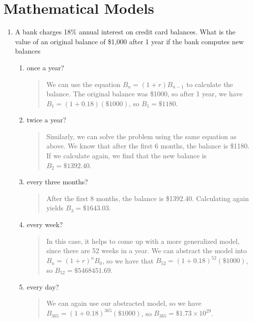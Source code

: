 \documentclass{hw}
\begin{document}
\section{Mathematical Models}
\begin{enumerate}
\item A bank charges 18\% annual interest on credit card balances. What is the value of an original
balance of \$1,000 after 1 year if the bank computes new balances
\begin{enumerate}
\item once a year?
\begin{quote}
We can use the equation $B_{n} = (1+r)B_{n-1}$ to calculate the balance. The original balance was \$1000,
so after 1 year, we have $B_{1} = (1+0.18)(\$1000)$, so $B_{1}=\$1180$.
\end{quote}
\item twice a year?
\begin{quote}
Similarly, we can solve the problem using the same equation as above. We know that after the first 6
months, the balance is \$1180. If we calculate again, we find that the new balance is $B_{2}=\$1392.40$.
\end{quote}
\item every three months?
\begin{quote}
After the first 8 months, the balance is \$1392.40. Calculating again yields $B_{3}=\$1643.03$.
\end{quote}
\item every week?
\begin{quote}
In this case, it helps to come up with a more generalized model, since there are 52 weeks in a year.
We can abstract the model into $B_{n}=(1+r)^nB_{0}$, so we have that $B_{52}=(1+0.18)^{52}(\$1000)$,
so $B_{52} = \$5468451.69$.
\end{quote}
\item every day?
\begin{quote}
We can again use our abstracted model, so we have $B_{365} = (1+0.18)^{365}(\$1000)$, so
$B_{365} = \$1.73\times10^{29}$.
\end{quote}
\end{enumerate}
\end{enumerate}
\end{document}
